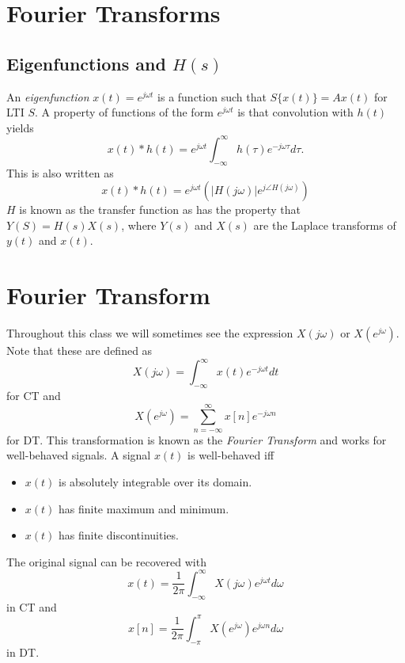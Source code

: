 \section{Fourier Transforms} \label{sec:fourier}

\subsection{Eigenfunctions and $H(s)$}

An \emph{eigenfunction} $x(t) = e^{j\omega t}$ is a function such that
$S\{x(t)\} = Ax(t)$ for LTI $S$. A property of functions of the form
$e^{j\omega t}$ is that convolution with $h(t)$ yields
\begin{equation}
    x(t) * h(t) = e^{j\omega t} \int_{-\infty}^{\infty} h(\tau) e^{-j\omega \tau} d\tau.
\end{equation}
This is also written as
\begin{equation}
    x(t) * h(t) = e^{j\omega t} \left( |H(j\omega)|e^{j \angle H(j\omega)} \right)
\end{equation}
$H$ is known as the transfer function as has the property that
$Y(S) = H(s)X(s)$, where $Y(s)$ and $X(s)$ are the Laplace transforms
of $y(t)$ and $x(t)$.

\section{Fourier Transform}
Throughout this class we will sometimes see the expression $X(j\omega)$
or $X(e^{j\omega})$.
Note that these are defined as
\begin{equation}
    X(j\omega) = \int_{-\infty}^{\infty} x(t) e^{-j\omega t} dt
\end{equation}
for CT and
\begin{equation}
    X(e^{j\omega}) = \sum_{n=-\infty}^{\infty} x[n] e^{-j\omega n}
\end{equation}
for DT. This transformation is known as the \emph{Fourier Transform}
and works for well-behaved signals.
A signal $x(t)$ is well-behaved iff
\begin{itemize}
    \item $x(t)$ is absolutely integrable over its domain.
    \item $x(t)$ has finite maximum and minimum.
    \item $x(t)$ has finite discontinuities.
\end{itemize}
The original signal can be recovered with
\begin{equation}
    x(t) = \frac{1}{2\pi} \int_{-\infty}^{\infty} X(j\omega) e^{j\omega t} d\omega
\end{equation}
in CT and
\begin{equation}
    x[n] = \frac{1}{2\pi} \int_{-\pi}^{\pi} X(e^{j\omega}) e^{j\omega n} d\omega
\end{equation}
in DT.

